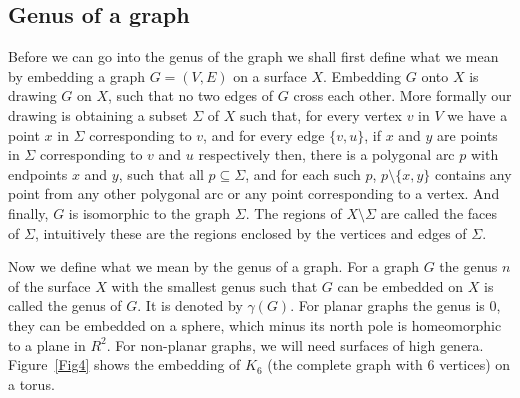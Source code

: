 \documentclass{article}
\begin{document}
\subsection*{Genus of a graph}\label{sec2.1}
    Before we can go into the genus of the graph we shall first define what we mean by embedding a graph $G = (V, E)$ on a surface $X$.
    Embedding $G$ onto $X$ is drawing $G$ on $X$, such that no two edges of $G$ cross each other. 
    More formally our drawing is obtaining a subset $\Sigma$ of $X$ such that, for every vertex $v$ in $V$ we have a point $x$ in $\Sigma$ corresponding to $v$, 
    and for every edge $\{v,u\}$, if $x$ and $y$ are points in $\Sigma$ corresponding to $v$ and $u$ respectively then, there is a polygonal arc $p$ with endpoints $x$ and $y$, such that all $p \subseteq \Sigma$, and for each such $p$, $p\setminus\{x, y\}$ contains any point from any other polygonal arc or any point corresponding to a vertex.
    And finally, $G$ is isomorphic to the graph $\Sigma$. The regions of $X \setminus \Sigma$ are called the faces of $\Sigma$, intuitively these are the regions enclosed by the vertices and edges of $\Sigma$.

    Now we define what we mean by the genus of a graph. For a graph $G$ the genus $n$ of the surface $X$ with the smallest genus such that $G$ can be embedded on $X$ is called the genus of $G$. 
    It is denoted by $\gamma(G)$. For planar graphs the genus is 0, they can be embedded on a sphere, which minus its north pole is homeomorphic to a plane in $R^2$. For non-planar graphs, we will need surfaces of high genera.
    Figure~\ref*{Fig4} shows the embedding of $K_6$ (the complete graph with 6 vertices) on a torus.
    
\end{document}
